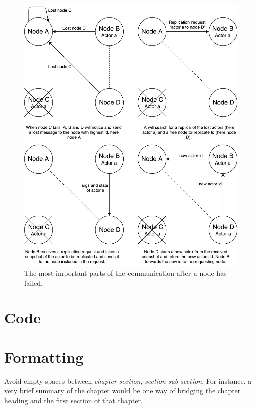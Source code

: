 \documentclass{cslthse-msc}
\begin{document}
\begin{appendices}
\begin{figure}[!hbt]
\centering
\includegraphics[scale=0.5]{images/replication_flow.pdf}
\caption{The most important parts of the communication after a node has failed.} \label{fig:replication_flow}
\end{figure}

\chapter{Code} \label{appendix:code}

\end{appendices}









\iffalse


\chapter[Short on Formatting]{Formatting}
Avoid empty spaces between \textit{chapter}-\textit{section}, \textit{section}-\textit{sub-section}. For instance, a very brief summary of the chapter would be one way of bridging the chapter heading and the first section of that chapter.
\end{document}
